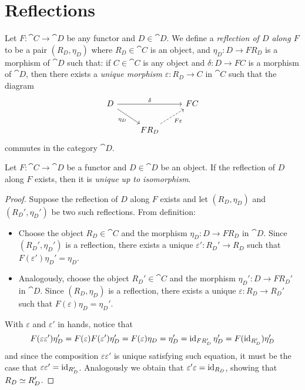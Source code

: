 \section{Reflections}

\begin{definition}
\label{def:reflection-functor}
Let \(F: \cat C \to \cat D\) be any functor and \(D \in \cat D\). We define a
\emph{reflection of \(D\) along \(F\)} to be a pair \((R_D, \eta_D)\) where
\(R_D \in \cat C\) is an object, and \(\eta_D: D \to F R_D\) is a morphism of
\(\cat D\) such that: if \(C \in \cat C\) is any object and
\(\delta: D \to F C\) is a morphism of \(\cat D\), then there exists a
\emph{unique morphism} \(\varepsilon: R_D \to C\) in \(\cat C\) such that the
diagram
\[
\begin{tikzcd}
D \ar[rd, "\eta_D"'] \ar[rr, "\delta"] & &F C \\
&F R_D \ar[ru, dashed, "F \varepsilon"'] &
\end{tikzcd}
\]
commutes in the category \(\cat D\).
\end{definition}

\begin{proposition}
\label{prop:reflection-unique-up-to-iso}
Let \(F: \cat C \to \cat D\) be a functor and \(D \in \cat D\) be an object. If
the reflection of \(D\) along \(F\) exists, then it is \emph{unique up to
  isomorphism}.
\end{proposition}

\begin{proof}
Suppose the reflection of \(D\) along \(F\) exists and let \((R_D, \eta_D)\) and
\((R_D', \eta_D')\) be two such reflections. From definition:
\begin{itemize}\setlength\itemsep{0em}
\item Choose the object \(R_D \in \cat C\) and the morphism
  \(\eta_D: D \to F R_D\) in \(\cat D\). Since \((R_D', \eta_D')\) is a reflection,
  there exists a unique \(\varepsilon': R_D' \to R_D\) such that \(F(\varepsilon') \eta_D' = \eta_D\).

\item Analogously, choose the object \(R_D' \in \cat C\) and the morphism
  \(\eta_D': D \to F R_D'\) in \(\cat D\). Since \((R_D, \eta_D)\) is a reflection,
  there exists a unique \(\varepsilon: R_D \to R_D'\) such that \(F(\varepsilon) \eta_D = \eta_D'\).
\end{itemize}
With \(\varepsilon\) and \(\varepsilon'\) in hands, notice that
\[
F(\varepsilon \varepsilon') \eta_D' = F(\varepsilon) F(\varepsilon') \eta_D' = F(\varepsilon) \eta_D = \eta_D'
= \operatorname{id}_{F R_D'} \eta_D' = F(\operatorname{id}_{R_D'}) \eta_D'
\]
and since the composition \(\varepsilon \varepsilon'\) is unique satisfying such equation, it must
be the case that \(\varepsilon \varepsilon' = \operatorname{id}_{R_D'}\). Analogously we obtain that
\(\varepsilon' \varepsilon = \operatorname{id}_{R_D}\), showing that \(R_D \simeq R_D'\).
\end{proof}

